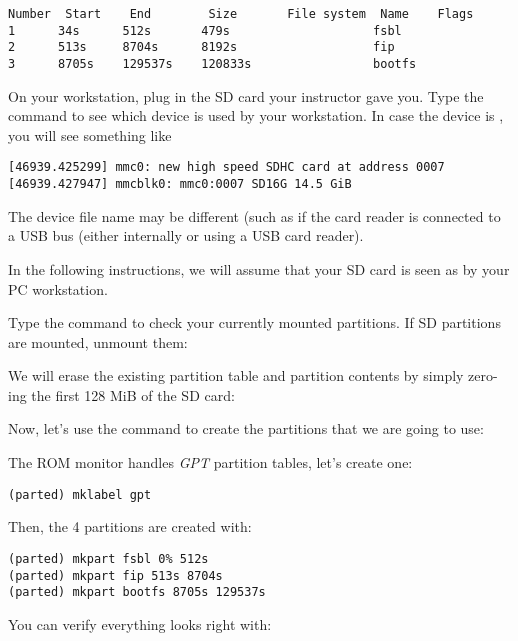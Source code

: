 \begin{verbatim}
Number  Start    End        Size       File system  Name    Flags
1      34s      512s       479s                    fsbl
2      513s     8704s      8192s                   fip
3      8705s    129537s    120833s                 bootfs 
\end{verbatim}

On your workstation, plug in the SD card your instructor gave you. Type
the  command to see which device is used by your
workstation. In case the device is , you will see
something like

\begin{verbatim}
[46939.425299] mmc0: new high speed SDHC card at address 0007
[46939.427947] mmcblk0: mmc0:0007 SD16G 14.5 GiB
\end{verbatim}

The device file name may be different (such as 
if the card reader is connected to a USB bus (either internally
or using a USB card reader).

In the following instructions, we will assume that your SD card is
seen as  by your PC workstation.

Type the  command to check your currently mounted
partitions. If SD partitions are mounted, unmount them:


We will erase the existing partition table and partition contents
by simply zero-ing the first 128 MiB of the SD card:


Now, let's use the  command to create the partitions that
we are going to use:


The ROM monitor handles {\em GPT} partition tables, let's create one:

\begin{verbatim}
(parted) mklabel gpt
\end{verbatim}

Then, the 4 partitions are created with:
\begin{verbatim}
(parted) mkpart fsbl 0% 512s
(parted) mkpart fip 513s 8704s
(parted) mkpart bootfs 8705s 129537s
\end{verbatim}

You can verify everything looks right with:

